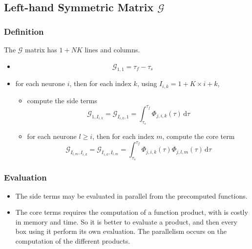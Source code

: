 \documentclass{revtex4}
\begin{document}
\subsection{Left-hand Symmetric Matrix $\mathcal{G}$}
\subsubsection{Definition}
The $\mathcal{G}$ matrix has $1+NK$ lines and columns.
\begin{itemize}
	\item 
		$$ 
		\mathcal{G}_{1,1} = \tau_f-\tau_s
		$$
	\item for each neurone $i$, then for each index $k$, using $I_{i,k}=1+K\times i + k$,
		\begin{itemize}
		\item compute the side terms
		$$
			\mathcal{G}_{1,I_{i,k}} = \mathcal{G}_{I_{i,k},1} = \int_{\tau_s}^{\tau_f} \Phi_{j,i,k}(\tau) \, \mathrm{d}\tau
		$$
		\item for each neurone $l\geq i$, then for each index $m$, compute the core term
		$$
			\mathcal{G}_{I_{l,m},I_{i,k}} = \mathcal{G}_{I_{i,k},I_{l,m}}  =
			\int_{\tau_s}^{\tau_f}  \Phi_{j,i,k}(\tau) \Phi_{j,l,m}(\tau) \, \mathrm{d}\tau
		$$
		\end{itemize}
\end{itemize}

\subsubsection{Evaluation}
\begin{itemize}
\item The side terms may be evaluated in parallel from the precomputed functions.

\item The core terms requires the computation of a function product, with is costly
in memory and time. So it is better to evaluate a product, and then 
every box using it perform its own evaluation.
 The parallelism occurs
on the computation of the different products.
\end{itemize}
\end{document}
